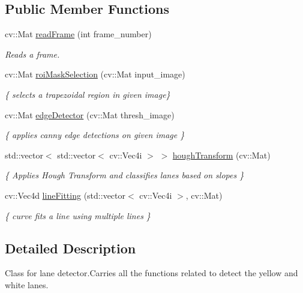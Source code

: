 \subsection*{Public Member Functions}
\begin{DoxyCompactItemize}
\item 
cv\+::\+Mat \hyperlink{classLaneDetector_aa29c19c559518b81897c90e545c3aae1}{read\+Frame} (int frame\+\_\+number)
\begin{DoxyCompactList}\small\item\em Reads a frame. \end{DoxyCompactList}\item 
cv\+::\+Mat \hyperlink{classLaneDetector_a5ad301b4756ae451f49b43947771c02f}{roi\+Mask\+Selection} (cv\+::\+Mat input\+\_\+image)
\begin{DoxyCompactList}\small\item\em \{ selects a trapezoidal region in given image\} \end{DoxyCompactList}\item 
cv\+::\+Mat \hyperlink{classLaneDetector_a2caab27786b6168a125313aa2c36434b}{edge\+Detector} (cv\+::\+Mat thresh\+\_\+image)
\begin{DoxyCompactList}\small\item\em \{ applies canny edge detections on given image \} \end{DoxyCompactList}\item 
std\+::vector$<$ std\+::vector$<$ cv\+::\+Vec4i $>$ $>$ \hyperlink{classLaneDetector_a88ab13cba16e8e817b6d913d5acd681b}{hough\+Transform} (cv\+::\+Mat)
\begin{DoxyCompactList}\small\item\em \{ Applies Hough Transform and classifies lanes based on slopes \} \end{DoxyCompactList}\item 
cv\+::\+Vec4d \hyperlink{classLaneDetector_a8cb3e5505c760fa460a01f8eacbb3f1c}{line\+Fitting} (std\+::vector$<$ cv\+::\+Vec4i $>$, cv\+::\+Mat)
\begin{DoxyCompactList}\small\item\em \{ curve fits a line using multiple lines \} \end{DoxyCompactList}\end{DoxyCompactItemize}


\subsection{Detailed Description}
Class for lane detector.\+Carries all the functions related to detect the yellow and white lanes. 


